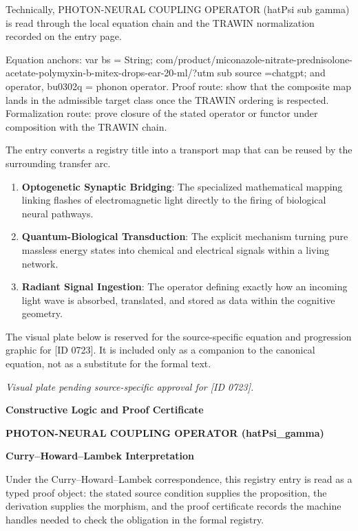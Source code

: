 Technically, PHOTON-NEURAL COUPLING OPERATOR (hatPsi sub gamma) is read through the local equation chain and the TRAWIN normalization recorded on the entry page.

Equation anchors: var bs = String; com/product/miconazole-nitrate-prednisolone-acetate-polymyxin-b-mitex-drops-ear-20-ml/?utm sub source =chatgpt; and operator, bu0302q = phonon operator. Proof route: show that the composite map lands in the admissible target class once the TRAWIN ordering is respected. Formalization route: prove closure of the stated operator or functor under composition with the TRAWIN chain.

The entry converts a registry title into a transport map that can be reused by the surrounding transfer arc.
\endgroup

\begin{enumerate}[leftmargin=1.6em,itemsep=6pt,topsep=4pt]
\item \textbf{Optogenetic Synaptic Bridging}: The specialized mathematical mapping linking flashes of electromagnetic light directly to the firing of biological neural pathways.
\item \textbf{Quantum-Biological Transduction}: The explicit mechanism turning pure massless energy states into chemical and electrical signals within a living network.
\item \textbf{Radiant Signal Ingestion}: The operator defining exactly how an incoming light wave is absorbed, translated, and stored as data within the cognitive geometry.
\end{enumerate}

\begingroup\footnotesize\sloppy
The visual plate below is reserved for the source-specific equation and progression graphic for [ID 0723]. It is included only as a companion to the canonical equation, not as a substitute for the formal text.
\par\endgroup
\begingroup\footnotesize\itshape
Visual plate pending source-specific approval for [ID 0723].
\par\endgroup

\clearpage
\begingroup\tzpsupportsetup
\noindent\textbf{\fontsize{10.8pt}{12.8pt}\selectfont [ID 0723] Constructive Logic and Proof Certificate}\par
\noindent\textbf{\fontsize{10pt}{12pt}\selectfont PHOTON-NEURAL COUPLING OPERATOR (hatPsi\_gamma)}\par
\vspace{0.45em}
\begingroup
\footnotesize
\setlength{\parskip}{0.22em}
\setlength{\parindent}{0pt}
\noindent\textbf{Curry--Howard--Lambek Interpretation}\par
Under the Curry--Howard--Lambek correspondence, this registry entry is read as a typed proof
object: the stated source condition supplies the proposition, the derivation supplies the
morphism, and the proof certificate records the machine handles needed to check the obligation
in the formal registry.

